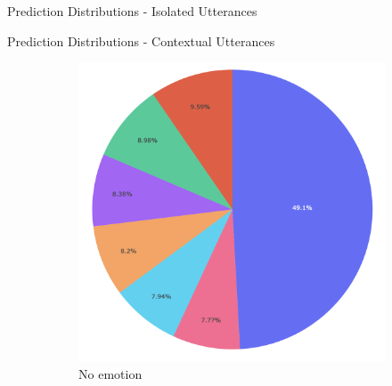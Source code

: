 \documentclass[11pt,aspectratio=169]{beamer}
\begin{document}
\begin{frame}{Prediction Distributions - Isolated Utterances}
\begin{figure}[!ht]
\begin{subfigure}{0.18\textwidth}
      \caption*{}
    \end{subfigure}
    \label{fig:pred_distrib}
    \end{figure}
    \end{frame}
    
    \begin{frame}{Prediction Distributions - Contextual Utterances}
    \begin{figure}[!ht]
        \centering
    \begin{subfigure}{0.19\textwidth}
      \includegraphics[width=\linewidth]{figures/no-emotion_context.png}
      \caption*{No emotion}
    \end{subfigure}\hfil
    \begin{subfigure}{0.19\textwidth}

\end{subfigure}
\end{figure}
\end{frame}
\end{document}
